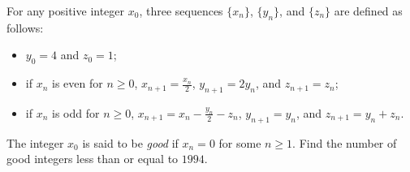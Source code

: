 For any positive integer $x_0$, three sequences $\{x_n\}$, $\{y_n\}$, and $\{z_n\}$ are defined as follows:
\begin{itemize}
\item[(i)] $y_0 = 4$ and $z_0 = 1$;
\item[(ii)] if $x_n$ is even for $n \geq 0$, $x_{n+1} = \frac{x_n}{2}$, $y_{n+1} = 2y_n$, and $z_{n+1} = z_n$;
\item[(iii)] if $x_n$ is odd for $n \geq 0$, $x_{n+1} = x_n - \frac{y_n}{2} - z_n$, $y_{n+1} = y_n$, and $z_{n+1} = y_n + z_n$.
\end{itemize}
The integer $x_0$ is said to be \emph{good} if $x_n = 0$ for some $n \geq 1$. Find the number of good integers less than or equal to $1994$.
